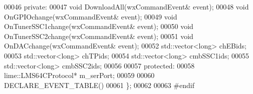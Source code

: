 \begin{DoxyCode}
00046 \textcolor{keyword}{private}:
00047     \textcolor{keywordtype}{void} DownloadAll(wxCommandEvent& event);
00048     \textcolor{keywordtype}{void} OnGPIOchange(wxCommandEvent& event);
00049     \textcolor{keywordtype}{void} OnTunerSSC1change(wxCommandEvent& event);
00050     \textcolor{keywordtype}{void} OnTunerSSC2change(wxCommandEvent& event);
00051     \textcolor{keywordtype}{void} OnDACchange(wxCommandEvent& event);
00052     std::vector<long> chEBids;
00053     std::vector<long> chTPids;
00054     std::vector<long> cmbSSC1ids;
00055     std::vector<long> cmbSSC2ids;
00056 
00057 \textcolor{keyword}{protected}:
00058     lime::LMS64CProtocol* m_serPort;
00059 
00060     DECLARE\_EVENT\_TABLE()
00061 \};
00062 
00063 \textcolor{preprocessor}{#endif}
\end{DoxyCode}
